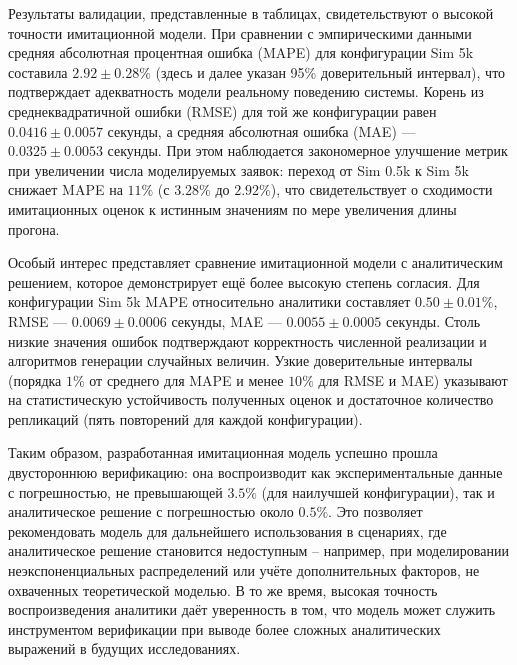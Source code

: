 \documentclass[12pt]{article}
\begin{document}
Результаты валидации, представленные в таблицах, свидетельствуют о высокой точности имитационной модели. При сравнении с эмпирическими данными средняя абсолютная процентная ошибка (MAPE) для конфигурации Sim 5k составила $2.92 \pm 0.28\%$ (здесь и далее указан 95\% доверительный интервал), что подтверждает адекватность модели реальному поведению системы. Корень из среднеквадратичной ошибки (RMSE) для той же конфигурации равен $0.0416 \pm 0.0057$ секунды, а средняя абсолютная ошибка (MAE) — $0.0325 \pm 0.0053$ секунды. При этом наблюдается закономерное улучшение метрик при увеличении числа моделируемых заявок: переход от Sim 0.5k к Sim 5k снижает MAPE на $11\%$ (с $3.28\%$ до $2.92\%$), что свидетельствует о сходимости имитационных оценок к истинным значениям по мере увеличения длины прогона.

Особый интерес представляет сравнение имитационной модели с аналитическим решением, которое демонстрирует ещё более высокую степень согласия. Для конфигурации Sim 5k MAPE относительно аналитики составляет $0.50 \pm 0.01\%$, RMSE — $0.0069 \pm 0.0006$ секунды, MAE — $0.0055 \pm 0.0005$ секунды. Столь низкие значения ошибок подтверждают корректность численной реализации и алгоритмов генерации случайных величин. Узкие доверительные интервалы (порядка $1\%$ от среднего для MAPE и менее $10\%$ для RMSE и MAE) указывают на статистическую устойчивость полученных оценок и достаточное количество репликаций (пять повторений для каждой конфигурации).

Таким образом, разработанная имитационная модель успешно прошла двустороннюю верификацию: она воспроизводит как экспериментальные данные с погрешностью, не превышающей $3.5\%$ (для наилучшей конфигурации), так и аналитическое решение с погрешностью около $0.5\%$. Это позволяет рекомендовать модель для дальнейшего использования в сценариях, где аналитическое решение становится недоступным – например, при моделировании неэкспоненциальных распределений или учёте дополнительных факторов, не охваченных теоретической моделью. В то же время, высокая точность воспроизведения аналитики даёт уверенность в том, что модель может служить инструментом верификации при выводе более сложных аналитических выражений в будущих исследованиях.
\end{document}
